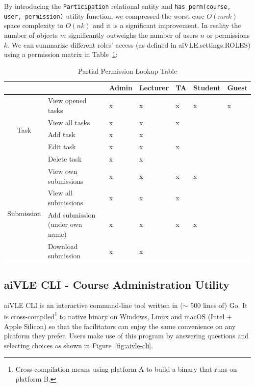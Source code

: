 By introducing the \texttt{Participation} relational entity and \texttt{has\_perm(course, user, permission)} utility function, we compressed the worst case $O(mnk)$ space complexity to $O(nk)$ and it is a significant improvement. In reality the number of objects $m$ significantly outweighs the number of users $n$ or permissions $k$. We can summarize different roles' access (as defined in aiVLE.settings.ROLES) using a permission matrix in Table~\ref{tab:aivle-web-permission-table}:

\begin{table}[H]
\centering
\begin{tabular}{|c|l|l|l|l|l|l|}
\hline
\multicolumn{1}{|l|}{} &  & Admin & Lecturer & TA & Student & Guest \\ \hline
\multirow{5}{*}{Task} & View opened tasks & x & x & x & x & x \\ \cline{2-7} 
 & View all tasks & x & x & x &  &  \\ \cline{2-7} 
 & Add task & x & x &  &  &  \\ \cline{2-7} 
 & Edit task & x & x & x &  &  \\ \cline{2-7} 
 & Delete task & x & x &  &  &  \\ \hline
\multirow{4}{*}{Submission} & View own submissions & x & x & x & x &  \\ \cline{2-7} 
 & View all submissions & x & x & x &  &  \\ \cline{2-7} 
 & Add submission (under own name) & x & x & x & x &  \\ \cline{2-7} 
 & Download submission & x & x &  &  &  \\ \hline
\end{tabular}
\caption{Partial Permission Lookup Table}
\label{tab:aivle-web-permission-table}
\end{table}

\subsection{aiVLE CLI - Course Administration Utility}
\label{ss:aivle-cli}

aiVLE CLI is an interactive command-line tool written in ($\sim$ 500 lines of) Go. It is cross-compiled\footnote{Cross-compilation means using platform A to build a binary that runs on platform B.} to native binary on Windows, Linux and macOS (Intel + Apple Silicon) so that the facilitators can enjoy the same convenience on any platform they prefer. Users make use of this program by answering questions and selecting choices as shown in Figure~\ref{fig:aivle-cli}.

